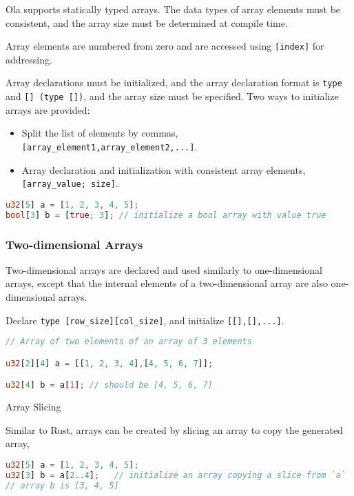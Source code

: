 Ola supports statically typed arrays. The data types of array elements must be consistent, and the array size must be determined at compile time. 

Array elements are numbered from zero and are accessed using \texttt{[index]} for addressing.

Array declarations must be initialized, and the array declaration format is \texttt{type} and \texttt{[] (\texttt{type []})}, and the array size must be specified.
Two ways to initialize arrays are provided:
\begin{itemize}
    \item Split the list of elements by commas, \texttt{[array\_element1,array\_element2,...]}.
    \item Array declaration and initialization with consistent array elements, \texttt{[array\_value; size]}.
\end{itemize}

\begin{lstlisting}[language=rust]
u32[5] a = [1, 2, 3, 4, 5]; 
bool[3] b = [true; 3]; // initialize a bool array with value true
\end{lstlisting}

\subsubsection*{Two-dimensional Arrays}

Two-dimensional arrays are declared and used similarly to one-dimensional arrays, except that the internal elements of a two-dimensional array are also one-dimensional arrays. 

Declare \texttt{type [row\_size][col\_size]}, and initialize \texttt{[[],[],...]}.

\begin{lstlisting}[language=rust]
// Array of two elements of an array of 3 elements

u32[2][4] a = [[1, 2, 3, 4],[4, 5, 6, 7]];

u32[4] b = a[1]; // should be [4, 5, 6, 7]
\end{lstlisting}

Array Slicing

Similar to Rust, arrays can be created by slicing an array to copy the generated array,

\begin{lstlisting}[language=rust]
u32[5] a = [1, 2, 3, 4, 5];
u32[3] b = a[2..4];   // initialize an array copying a slice from `a`
// array b is [3, 4, 5]
\end{lstlisting}

